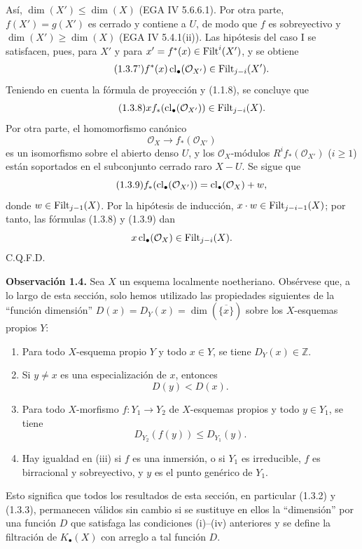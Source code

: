 Así, $\dim(X')\leq\dim(X)$ (EGA IV 5.6.6.1). Por otra parte,
$f(X')=g(X')$ es cerrado y contiene a $U$, de modo que $f$ es sobreyectivo y
$\dim(X')\geq\dim(X)$ (EGA IV 5.4.1(ii)). Las hipótesis del caso I se
satisfacen, pues, para $X'$ y para
$x'=f^*(x)\in\operatorname{Filt}^i(X')$, y se obtiene
\begin{equation}\tag{1.3.7'}
f^*(x)\operatorname{cl}_\bullet(\mathcal O_{X'})\in\operatorname{Filt}_{j-i}(X').
\end{equation}
Teniendo en cuenta la fórmula de proyección y (1.1.8), se concluye que
\begin{equation}\tag{1.3.8}
x f_*(\operatorname{cl}_\bullet(\mathcal O_{X'}))\in\operatorname{Filt}_{j-i}(X).
\end{equation}
Por otra parte, el homomorfismo canónico
\[
\mathcal O_X\longrightarrow f_*(\mathcal O_{X'})
\]
es un isomorfismo sobre el abierto denso $U$, y los $\mathcal O_X$-módulos
$R^if_*(\mathcal O_{X'})$ ($i\geq1$) están soportados en el subconjunto
cerrado raro $X-U$. Se sigue que
\begin{equation}\tag{1.3.9}
f_*(\operatorname{cl}_\bullet(\mathcal O_{X'}))
=\operatorname{cl}_\bullet(\mathcal O_X)+w,
\end{equation}
donde $w\in\operatorname{Filt}_{j-1}(X)$. Por la hipótesis de inducción,
$x\cdot w\in\operatorname{Filt}_{j-i-1}(X)$; por tanto, las fórmulas (1.3.8) y (1.3.9)
dan
\[
x\operatorname{cl}_\bullet(\mathcal O_X)\in\operatorname{Filt}_{j-i}(X).
\]
C.Q.F.D.

\textbf{Observación 1.4.}
Sea $X$ un esquema localmente noetheriano. Obsérvese que, a lo largo de esta
sección, solo hemos utilizado las propiedades siguientes de la ``función
dimensión''
$D(x)=D_Y(x)=\dim(\overline{\{x\}})$ sobre los $X$-esquemas propios $Y$:
\begin{enumerate}
\item[(i)] Para todo $X$-esquema propio $Y$ y todo $x\in Y$, se tiene
$D_Y(x)\in\mathbb Z$.
\item[(ii)] Si $y\ne x$ es una especialización de $x$, entonces
\[
D(y)<D(x).
\]
\item[(iii)] Para todo $X$-morfismo $f:Y_1\to Y_2$ de $X$-esquemas propios
y todo $y\in Y_1$, se tiene
\[
D_{Y_2}(f(y))\leq D_{Y_1}(y).
\]
\item[(iv)] Hay igualdad en (iii) si $f$ es una inmersión, o si $Y_1$ es
irreducible, $f$ es birracional y sobreyectivo, y $y$ es el punto genérico de
$Y_1$.
\end{enumerate}
Esto significa que todos los resultados de esta sección, en particular
(1.3.2) y (1.3.3), permanecen válidos sin cambio si se sustituye en ellos la
``dimensión'' por una función $D$ que satisfaga las condiciones (i)--(iv)
anteriores y se define la filtración de $K_\bullet(X)$ con arreglo a tal
función $D$.
